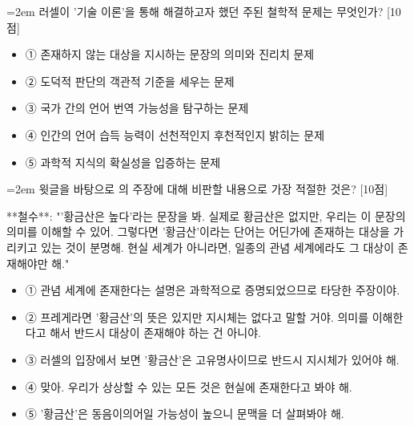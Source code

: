 \documentclass[10pt,a4paper]{article}
\newcommand{\qnum}[1]{%
  \tikz[baseline=(num.base)]{%
    \node[circle, fill=numCircle, text=white, inner sep=0pt,
          minimum size=18pt, font=\small\bfseries] (num) {#1};%
  }%
}
\newcommand{\pts}[1]{%
  \hfill\textcolor{ptsBadge}{[#1점]}%
}
\begin{document}
\vspace{4mm}
\begin{minipage}{\columnwidth}
{\hangindent=2em
\qnum{31}\enspace 러셀이 '기술 이론'을 통해 해결하고자 했던 주된 철학적 문제는 무엇인가? \pts{10}
\par}

\vspace{3mm}
\begin{itemize}[leftmargin=2.5em, labelsep=0.3em, label={}, itemsep=4pt, parsep=1pt, topsep=0pt]
  \item ① 존재하지 않는 대상을 지시하는 문장의 의미와 진리치 문제
  \item ② 도덕적 판단의 객관적 기준을 세우는 문제
  \item ③ 국가 간의 언어 번역 가능성을 탐구하는 문제
  \item ④ 인간의 언어 습득 능력이 선천적인지 후천적인지 밝히는 문제
  \item ⑤ 과학적 지식의 확실성을 입증하는 문제
\end{itemize}
\end{minipage}
\vspace{4mm}

\vspace{4mm}
\begin{minipage}{\columnwidth}
{\hangindent=2em
\qnum{32}\enspace 윗글을 바탕으로 의 주장에 대해 비판할 내용으로 가장 적절한 것은? \pts{10}
\par}

\vspace{3mm}
\begin{tcolorbox}[bogi]
**철수**: "'황금산은 높다'라는 문장을 봐. 실제로 황금산은 없지만, 우리는 이 문장의 의미를 이해할 수 있어. 그렇다면 '황금산'이라는 단어는 어딘가에 존재하는 대상을 가리키고 있는 것이 분명해. 현실 세계가 아니라면, 일종의 관념 세계에라도 그 대상이 존재해야만 해."
\end{tcolorbox}
\vspace{3mm}
\begin{itemize}[leftmargin=2.5em, labelsep=0.3em, label={}, itemsep=4pt, parsep=1pt, topsep=0pt]
  \item ① 관념 세계에 존재한다는 설명은 과학적으로 증명되었으므로 타당한 주장이야.
  \item ② 프레게라면 '황금산'의 뜻은 있지만 지시체는 없다고 말할 거야. 의미를 이해한다고 해서 반드시 대상이 존재해야 하는 건 아니야.
  \item ③ 러셀의 입장에서 보면 '황금산'은 고유명사이므로 반드시 지시체가 있어야 해.
  \item ④ 맞아. 우리가 상상할 수 있는 모든 것은 현실에 존재한다고 봐야 해.
  \item ⑤ '황금산'은 동음이의어일 가능성이 높으니 문맥을 더 살펴봐야 해.
\end{itemize}
\end{minipage}
\vspace{4mm}
\end{document}
